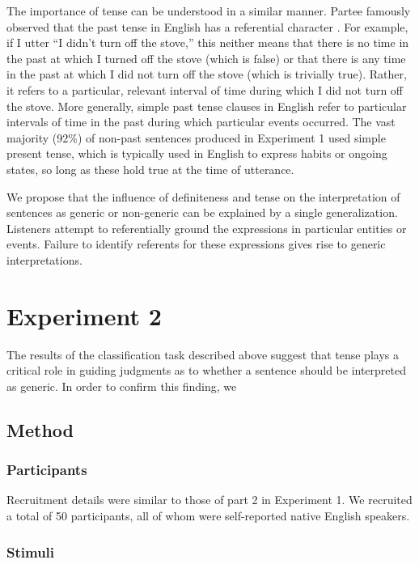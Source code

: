 \documentclass[10pt,letterpaper]{article}
\begin{document}
The importance of tense can be understood in a similar manner. Partee famously observed that the past tense in English has a referential character \cite{Partee:1973}. For example, if I utter ``I didn't turn off the stove,'' this neither means that there is no time in the past at which I turned off the stove (which is false) or that there is any time in the past at which I did not turn off the stove (which is trivially true). Rather, it refers to a particular, relevant interval of time during which I did not turn off the stove. More generally, simple past tense clauses in English refer to particular intervals of time in the past during which particular events occurred. The vast majority (92\%) of non-past sentences produced in Experiment 1 used simple present tense, which is typically used in English to express habits or ongoing states, so long as these hold true at the time of utterance.

We propose that the influence of definiteness and tense on the interpretation of sentences as generic or non-generic can be explained by a single generalization. Listeners attempt to referentially ground the expressions in particular entities or events. Failure to identify referents for these expressions gives rise to generic interpretations.

\section{Experiment 2}

The results of the classification task described above suggest that tense plays a critical role in guiding judgments as to whether a sentence should be interpreted as generic. In order to confirm this finding, we  

\subsection{Method}

\subsubsection{Participants} 

Recruitment details were similar to those of part 2 in Experiment 1. We recruited a total of 50 participants, all of whom were self-reported native English speakers.

\subsubsection{Stimuli}  
\end{document}
